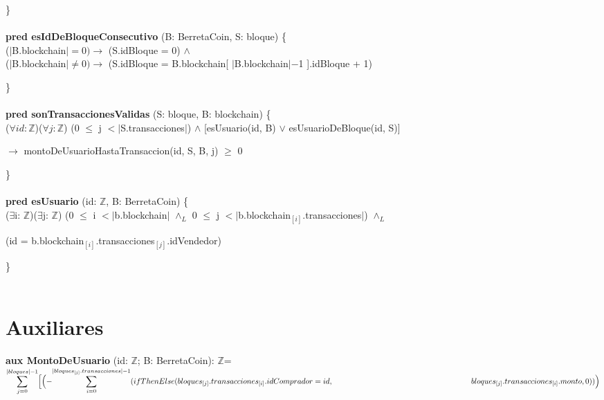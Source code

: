 \documentclass{article}
\newcommand{\Entero}{$\mathds{Z}$}
\begin{document}
    \}\\\\

    \textbf{pred esIdDeBloqueConsecutivo} (B: BerretaCoin, S: bloque) \{\\
        \indent\indent ($|$B.blockchain$| = 0)\rightarrow$ (S.idBloque = 0) $\land$\\
        \indent\indent ($|$B.blockchain$| \ne 0) \rightarrow$ (S.idBloque = B.blockchain[ $|$B.blockchain$|-$1 ].idBloque + 1)

    \}\\\\

    \textbf{pred sonTransaccionesValidas} (S: bloque, B: blockchain) \{\\
        \indent\indent ($\forall id:$\Entero)($\forall j:$\Entero) (0 $\le$ j $<|$S.transacciones$|$) $\land$ [esUsuario(id, B) $\lor$ esUsuarioDeBloque(id, S)]
        
        \indent\indent\indent\indent\indent\indent\indent $\rightarrow$ montoDeUsuarioHastaTransaccion(id, S, B, j) $\ge$ 0

    \}\\\\

    \textbf{pred esUsuario} (id: \Entero, B: BerretaCoin) \{\\
        \indent\indent($\exists$i: \Entero)($\exists$j: \Entero) (0 $\leq$ i $< |$b.blockchain$|$ $\land_{L}$ 0 $\le$ j $< |$b.blockchain$_{[i]}$.transacciones$|$) $\land_{L}$

        \indent\indent(id = b.blockchain$_{[i]}$.transacciones$_{[j]}$.idVendedor)

    \}\\\\











\newpage
\section*{Auxiliares}

    \textbf{aux MontoDeUsuario} (id: \Entero; B: BerretaCoin): \Entero =\\

        \indent\indent
        $\mathlarger\sum\limits_{j=0}^{|bloques| - 1}
        \Bigl[\Bigl(-\mathlarger\sum\limits_{i=0}^{|bloques_{[j]}.transacciones|-1} (ifThenElse (bloques_{[j]}.transacciones_{[i]}.idComprador = id,\\
        \indent\indent\indent\indent\indent\indent\indent\indent\indent\indent\indent\indent bloques_{[j]}.transacciones_{[i]}.monto, 0))\Bigr)$ \\
\end{document}

